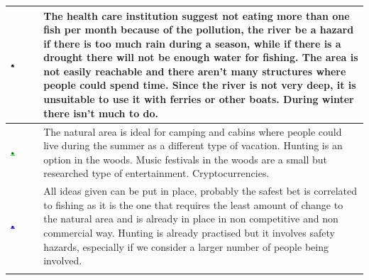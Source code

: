 \begin{center}
\begin{tabular}{ | m{} | m{}| }
\hline
\includegraphics[width=0.20\textwidth]{Img/Black.png} & The health care institution suggest not eating more than one fish per month because of the pollution, the river be a hazard if there is too much rain during a season, while if there is a drought there will not be enough water for fishing. \newline The area is not easily reachable and there aren't many structures where people could spend time. \newline Since the river is not very deep, it is unsuitable to use it with ferries or other boats. \newline During winter there isn't much to do. \\ 
\hline
\includegraphics[width=0.20\textwidth]{Img/Green.png} & The natural area is ideal for camping and cabins where people could live during the summer as a different type of vacation. \newline Hunting is an option in the woods. \newline Music festivals in the woods are a small but researched type of entertainment. Cryptocurrencies. \\  
\hline
\includegraphics[width=0.20\textwidth]{Img/Blue.png} & All ideas given can be put in place, probably the safest bet is correlated to fishing as it is the one that requires the least amount of change to the natural area and is already in place in non competitive and non commercial way. \newline Hunting is already practised but it involves safety hazards, especially if we consider a larger number of people being involved. \\  \\ 
\hline
\end{tabular}
\end{center}
